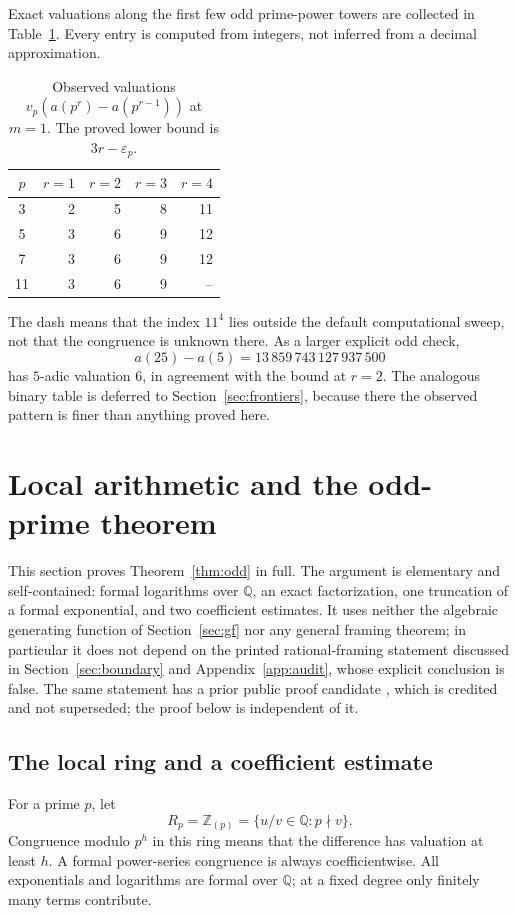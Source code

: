 \documentclass[11pt,a4paper]{article}
\numberwithin{equation}{section}
\theoremstyle{definition}
\theoremstyle{remark}
\newcommand{\Z}{\mathbb Z}
\newcommand{\Q}{\mathbb Q}
\newcommand{\eps}{\varepsilon}
\begin{document}
Exact valuations along the first few odd prime-power towers are collected in
Table~\ref{tab:valuations}. Every entry is computed from integers, not
inferred from a decimal approximation.
\begin{table}[htbp]
\centering
\small
\caption{Observed valuations $v_p(a(p^r)-a(p^{r-1}))$ at $m=1$.
The proved lower bound is $3r-\eps_p$.}
\label{tab:valuations}
\begin{tabular}{c r r r r}
\toprule
$p$ & $r=1$ & $r=2$ & $r=3$ & $r=4$\\
\midrule
3 & 2 & 5 & 8 & 11\\
5 & 3 & 6 & 9 & 12\\
7 & 3 & 6 & 9 & 12\\
11 & 3 & 6 & 9 & --\\
\bottomrule
\end{tabular}
\end{table}
The dash means that the index $11^4$ lies outside the default computational
sweep, not that the congruence is unknown there. As a larger explicit odd
check,
\[
 a(25)-a(5)=13\,859\,743\,127\,937\,500
\]
has $5$-adic valuation $6$, in agreement with the bound at $r=2$. The
analogous binary table is deferred to Section~\ref{sec:frontiers}, because
there the observed pattern is finer than anything proved here.

\section{Local arithmetic and the odd-prime theorem}
\label{sec:odd}

This section proves Theorem~\ref{thm:odd} in full. The argument is
elementary and self-contained: formal logarithms over $\Q$, an exact
factorization, one truncation of a formal exponential, and two coefficient
estimates. It uses neither the algebraic generating function of
Section~\ref{sec:gf} nor any general framing theorem; in particular it does
not depend on the printed rational-framing statement discussed in
Section~\ref{sec:boundary} and Appendix~\ref{app:audit}, whose explicit
conclusion is false. The same statement has a prior public proof candidate
\cite{prior}, which is credited and not superseded; the proof below is
independent of it.

\subsection{The local ring and a coefficient estimate}
For a prime $p$, let
\[
 R_p=\Z_{(p)}=\{u/v\in\Q:p\nmid v\}.
\]
Congruence modulo $p^h$ in this ring means that the difference has valuation
at least $h$. A formal power-series congruence is always coefficientwise.
All exponentials and logarithms are formal over $\Q$; at a fixed degree only
finitely many terms contribute.
\end{document}
